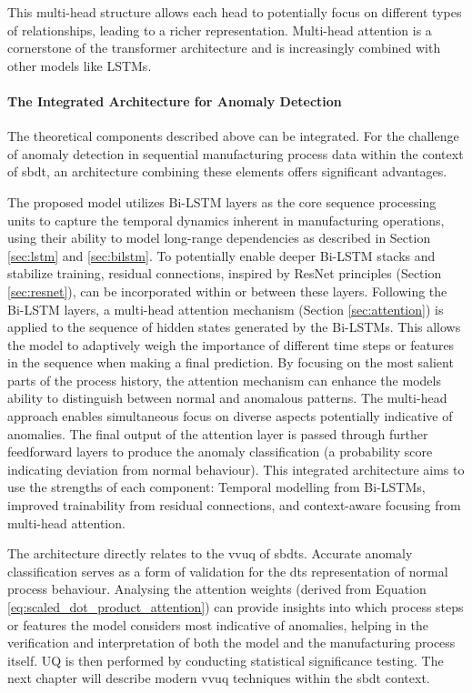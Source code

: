This multi-head structure allows each head to potentially focus on different types of relationships, leading to a richer representation. Multi-head attention is a cornerstone of the transformer architecture \autocite{vaswani2017attention} and is increasingly combined with other models like LSTMs.

\paragraph{\textbf{The Integrated Architecture for Anomaly Detection}}
\label{sec:integrated_architecture}

The theoretical components described above can be integrated. For the challenge of anomaly detection in sequential manufacturing process data within the context of \gls{sbdt}, an architecture combining these elements offers significant advantages.

The proposed model utilizes Bi-LSTM layers as the core sequence processing units to capture the temporal dynamics inherent in manufacturing operations, using their ability to model long-range dependencies as described in Section \autoref{sec:lstm} and \autoref{sec:bilstm}. To potentially enable deeper Bi-LSTM stacks and stabilize training, residual connections, inspired by ResNet principles (Section \autoref{sec:resnet}), can be incorporated within or between these layers.
Following the Bi-LSTM layers, a multi-head attention mechanism (Section \autoref{sec:attention}) is applied to the sequence of hidden states generated by the Bi-LSTMs. This allows the model to adaptively weigh the importance of different time steps or features in the sequence when making a final prediction. By focusing on the most salient parts of the process history, the attention mechanism can enhance the models ability to distinguish between normal and anomalous patterns. The multi-head approach enables simultaneous focus on diverse aspects potentially indicative of anomalies. The final output of the attention layer is passed through further feedforward layers to produce the anomaly classification (a probability score indicating deviation from normal behaviour). This integrated architecture aims to use the strengths of each component: Temporal modelling from Bi-LSTMs, improved trainability from residual connections, and context-aware focusing from multi-head attention.

The architecture directly relates to the \gls{vvuq} of \gls{sbdt}s. Accurate anomaly classification serves as a form of validation for the \gls{dt}s representation of normal process behaviour. Analysing the attention weights (derived from Equation \autoref{eq:scaled_dot_product_attention}) can provide insights into which process steps or features the model considers most indicative of anomalies, helping in the verification and interpretation of both the model and the manufacturing process itself. UQ is then performed by conducting statistical significance testing. The next chapter will describe modern \gls{vvuq} techniques within the \gls{sbdt} context.



